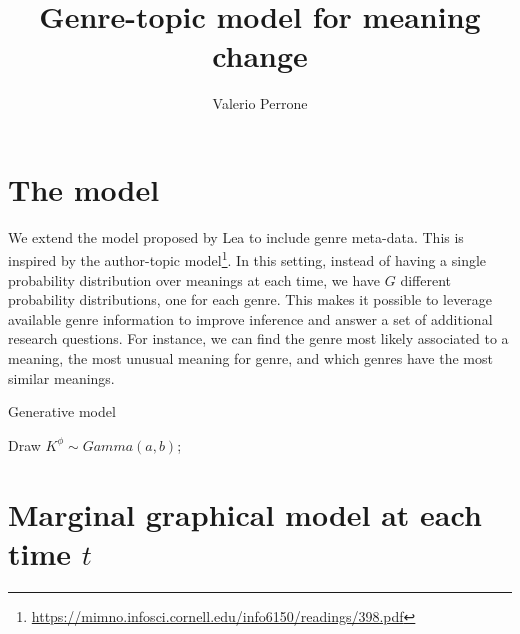 \documentclass{article}
\title{Genre-topic model for meaning change}
\author{Valerio Perrone}
\begin{document}
\maketitle 

\section{The model}
We extend the model proposed by Lea to include genre meta-data. This is inspired by the author-topic model\footnote{ \url{https://mimno.infosci.cornell.edu/info6150/readings/398.pdf}}. In this setting, instead of having a single probability distribution over meanings at each time, we have $G$ different probability distributions, one for each genre. This makes it possible to leverage available genre information to improve inference and answer a set of additional research questions. For instance, we can find the genre most likely associated to a meaning, the most unusual meaning for genre, and which genres have the most similar meanings.


\begin{algorithm}
\caption{Generative model}
\label{algo2}
\SetAlgoLined

Draw $K^\phi \sim Gamma(a,b)$; \\

\end{algorithm}



\section{Marginal graphical model at each time $t$}
\end{document}
